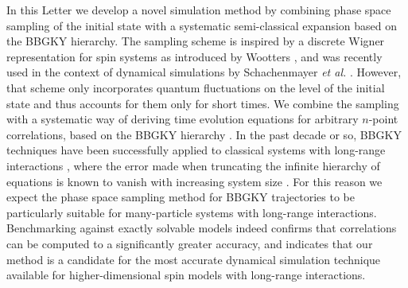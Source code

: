 \documentclass[aps,prl,showpacs,amsmath,amssymb,superscriptaddress,reprint,10pt]{revtex4-1}
\begin{document}
In this Letter we develop a novel simulation method by combining phase space sampling of the initial state with a systematic semi-classical expansion based on the BBGKY hierarchy. The sampling scheme is inspired by a discrete Wigner representation for spin systems as introduced by Wootters \cite{Wootters87}, and was recently used in the context of dynamical simulations by Schachenmayer {\em et al.} \cite{Schachenmayer_etal15,Schachenmayer_etalNJP15}. However, that scheme only incorporates quantum fluctuations on the level of the initial state and thus accounts for them only for short times. We combine the sampling with a systematic way of deriving time evolution equations for arbitrary $n$-point correlations, based on the BBGKY hierarchy \cite{Bonitz}. In the past decade or so, BBGKY techniques have been successfully applied to classical systems with long-range interactions \cite{BouchetDauxois05,*Nardini_etal12}, where the error made when truncating the infinite hierarchy of equations 
is known to vanish with increasing system size \cite{BraunHepp77}. For this reason we expect the phase space sampling method for BBGKY trajectories to be particularly suitable for many-particle systems with long-range interactions. Benchmarking against exactly solvable models indeed confirms that correlations can be computed to a significantly greater accuracy, and indicates that our method is a candidate for the most accurate dynamical simulation technique available for higher-dimensional spin models with long-range interactions.
\end{document}
